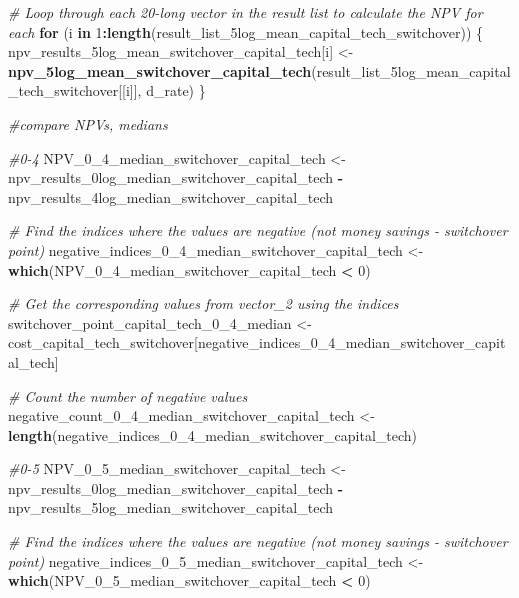 \documentclass[
]{article}
\newenvironment{Shaded}{\begin{snugshade}}{\end{snugshade}}
\newcommand{\CommentTok}[1]{\textcolor[rgb]{0.56,0.35,0.01}{\textit{#1}}}
\newcommand{\ControlFlowTok}[1]{\textcolor[rgb]{0.13,0.29,0.53}{\textbf{#1}}}
\newcommand{\DecValTok}[1]{\textcolor[rgb]{0.00,0.00,0.81}{#1}}
\newcommand{\FunctionTok}[1]{\textcolor[rgb]{0.13,0.29,0.53}{\textbf{#1}}}
\newcommand{\NormalTok}[1]{#1}
\newcommand{\OtherTok}[1]{\textcolor[rgb]{0.56,0.35,0.01}{#1}}
\newcommand{\SpecialCharTok}[1]{\textcolor[rgb]{0.81,0.36,0.00}{\textbf{#1}}}
\begin{document}
\begin{Shaded}
\begin{Highlighting}[]
\CommentTok{\# Loop through each 20{-}long vector in the result list to calculate the NPV for each}
\ControlFlowTok{for}\NormalTok{ (i }\ControlFlowTok{in} \DecValTok{1}\SpecialCharTok{:}\FunctionTok{length}\NormalTok{(result\_list\_5log\_mean\_capital\_tech\_switchover)) \{}
\NormalTok{  npv\_results\_5log\_mean\_switchover\_capital\_tech[i] }\OtherTok{\textless{}{-}} \FunctionTok{npv\_5log\_mean\_switchover\_capital\_tech}\NormalTok{(result\_list\_5log\_mean\_capital\_tech\_switchover[[i]], d\_rate)}
\NormalTok{\}}



\CommentTok{\#compare NPVs, medians}

\CommentTok{\#0{-}4}
\NormalTok{NPV\_0\_4\_median\_switchover\_capital\_tech }\OtherTok{\textless{}{-}}\NormalTok{ npv\_results\_0log\_median\_switchover\_capital\_tech }\SpecialCharTok{{-}}\NormalTok{ npv\_results\_4log\_median\_switchover\_capital\_tech}

\CommentTok{\# Find the indices where the values are negative (not money savings {-} switchover point)}
\NormalTok{negative\_indices\_0\_4\_median\_switchover\_capital\_tech }\OtherTok{\textless{}{-}} \FunctionTok{which}\NormalTok{(NPV\_0\_4\_median\_switchover\_capital\_tech }\SpecialCharTok{\textless{}} \DecValTok{0}\NormalTok{)}

\CommentTok{\# Get the corresponding values from vector\_2 using the indices}
\NormalTok{switchover\_point\_capital\_tech\_0\_4\_median }\OtherTok{\textless{}{-}}\NormalTok{ cost\_capital\_tech\_switchover[negative\_indices\_0\_4\_median\_switchover\_capital\_tech]}

\CommentTok{\# Count the number of negative values}
\NormalTok{negative\_count\_0\_4\_median\_switchover\_capital\_tech }\OtherTok{\textless{}{-}} \FunctionTok{length}\NormalTok{(negative\_indices\_0\_4\_median\_switchover\_capital\_tech)}



\CommentTok{\#0{-}5}
\NormalTok{NPV\_0\_5\_median\_switchover\_capital\_tech }\OtherTok{\textless{}{-}}\NormalTok{ npv\_results\_0log\_median\_switchover\_capital\_tech }\SpecialCharTok{{-}}\NormalTok{ npv\_results\_5log\_median\_switchover\_capital\_tech}

\CommentTok{\# Find the indices where the values are negative (not money savings {-} switchover point)}
\NormalTok{negative\_indices\_0\_5\_median\_switchover\_capital\_tech }\OtherTok{\textless{}{-}} \FunctionTok{which}\NormalTok{(NPV\_0\_5\_median\_switchover\_capital\_tech }\SpecialCharTok{\textless{}} \DecValTok{0}\NormalTok{)}


\end{Highlighting}
\end{Shaded}
\end{document}
